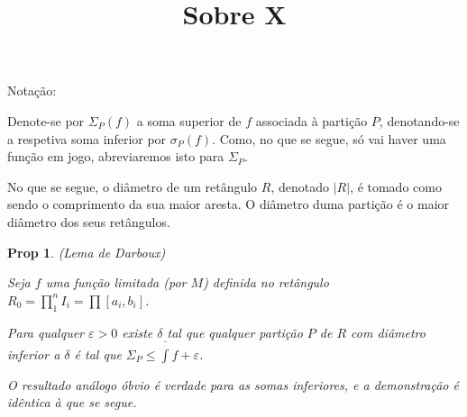 \documentclass{article}
\title{Sobre X}
\author{}
\date{}
\newtheorem{prop}{Prop}
\newcommand{\diam}[1]{\lvert #1 \rvert}
\begin{document}
	Notação:
	
	Denote-se por $\Sigma_P(f)$ a soma superior de $f$ associada à partição $P$, denotando-se a respetiva soma inferior por $\sigma_P(f)$. Como, no que se segue, só vai haver uma função em jogo, abreviaremos isto para $\Sigma_P$.
	
	No que se segue, o diâmetro de um retângulo $R$, denotado $\diam{R}$, é tomado como sendo o comprimento da sua maior aresta. O diâmetro duma partição é o maior diâmetro dos seus retângulos.

	\begin{prop} (Lema de Darboux)
	
	Seja $f$ uma função limitada (por $M$) definida no retângulo $R_0 = \prod_1^n I_i = \prod \left[ a_i, b_i \right]$.
	
	Para qualquer $\varepsilon > 0$ existe $\delta$ tal que qualquer partição $P$ de $R$ com diâmetro inferior a $\delta$ é tal que $\Sigma_P \leq \overline{\int} f + \varepsilon$.
	
	O resultado análogo óbvio é verdade para as somas inferiores, e a demonstração é idêntica à que se segue.
	\end{prop}
	
\end{document}
